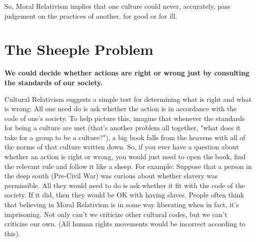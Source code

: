 So, Moral Relativism implies that one culture could never, accurately, pass judgement on the practices of another, for good or for ill.

\section{The Sheeple Problem}

\begin{center}
\textbf{We could decide whether actions are right or wrong just by consulting the standards of our society.}
\end{center}

Cultural Relativism suggests a simple test for determining what is right and what is wrong: All one need do is ask whether the action is in accordance with the code of one's society. To help picture this, imagine that whenever the standards for being a culture are met (that's another problem all together, "what does it take for a group to be a culture?"), a big book falls from the heavens with all of the norms of that culture written down. So, if you ever have a question about whether an action is right or wrong, you would just need to open the book, find the relevant rule and follow it like a sheep.  For example:  Suppose that a person in the deep south (Pre-Civil War) was curious about whether slavery was permissible. All they would need to do is ask whether it fit with the code of the society. If it did, then they would be OK with having slaves. People often think that believing in Moral Relativism is in some way liberating when in fact, it's imprisoning.  Not only can’t we criticize other cultural codes, but we can’t criticize our own. (All human rights movements would be incorrect according to this).

